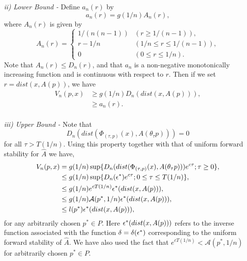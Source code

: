 \begin{prf}
  {\em ii) Lower Bound -} Define $a_n(r)$ by
  \[ a_n(r) = g(1/n) A_n(r), \]
  where $A_n(r)$ is given by
  \begin{equation*}
  A_n( r ) = \begin{cases}
  1/\left(n(n-1)\right) & (r \geq 1/(n-1) ), \\
  r - 1/n & ( 1/n \leq r \leq 1/(n-1) ), \\
  0 & ( 0 \leq r \leq 1/n ).
  \end{cases}
  \end{equation*}
  Note that $A_n(r) \leq D_n(r)$, and that $a_n$ is a non-negative
  monotonically increasing function and is continuous with respect to $r$.
  Then if we set $r = dist( x, A(p) )$, we have
  \begin{align*}
  V_n(p, x) &\geq g(1/n) D_n(dist( x, A(p) ) ), \\
  &\geq a_n(r). \\
  \end{align*}

  {\em iii) Upper Bound -} Note that
  \[ D_n( dist( \Phi_{(\tau, p)}(x), A(\theta_{\tau} p) ) ) = 0 \]
  for all $\tau > T(1/n)$. Using this property together with that of
  uniform forward stability for $\hat{A}$ we have,
  \begin{align*}
  V_n(p, x) &= g(1/n) \sup \{ D_n( dist(
  \Phi_{(\tau, p)}(x), A(\theta_{\tau} p) ) ) e^{c \tau }; \tau \geq 0 \}, \\
   &\leq g(1/n) \sup \{ D_n( \epsilon^* )
   e^{c \tau } ; 0 \leq \tau \leq T(1/n) \}, \\
   &\leq g(1/n) e^{cT(1/n)} \epsilon^*( dist(x, A(p)) ), \\
   &\leq g(1/n) \mathcal{A}(p^*, 1/n) \epsilon^*( dist(x, A(p)) ), \\
   &\leq l(p^*) \epsilon^*( dist(x, A(p)) ),
  \end{align*}
  for any arbitrarily chosen $p^* \in P$.
  Here $\epsilon^*( dist(x, A(p)) )$ refers to the inverse function associated with
the function $\delta =   \delta( \epsilon^* )$ corresponding to the uniform forward
stability of $\hat{A}$. We have also used the fact that $e^{cT(1/n)} <
\mathcal{A}(p^*, 1/n)$ for arbitrarily chosen $p^* \in P$.


\end{prf}
